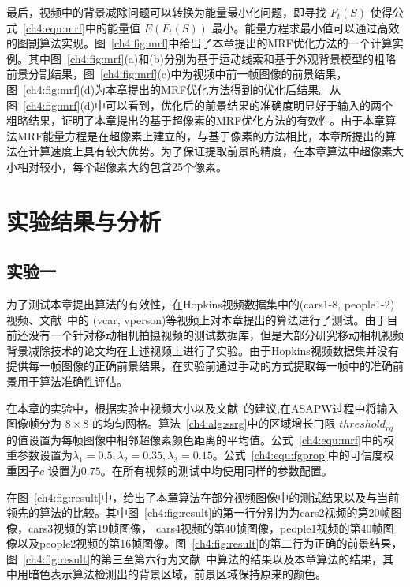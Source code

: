 最后，视频中的背景减除问题可以转换为能量最小化问题，即寻找 $F_{t}(S)$ 使得公式~\ref{ch4:equ:mrf}中的能量值 $E(F_{t}(S))$ 最小。能量方程求最小值可以通过高效的图割算法\cite{graphcut04}实现。图~\ref{ch4:fig:mrf}中给出了本章提出的MRF优化方法的一个计算实例。其中图~\ref{ch4:fig:mrf}(a)和(b)分别为基于运动线索和基于外观背景模型的粗略前景分割结果，图~\ref{ch4:fig:mrf}(c)中为视频中前一帧图像的前景结果，图~\ref{ch4:fig:mrf}(d)为本章提出的MRF优化方法得到的优化后结果。从图~\ref{ch4:fig:mrf}(d)中可以看到，优化后的前景结果的准确度明显好于输入的两个粗略结果，证明了本章提出的基于超像素的MRF优化方法的有效性。由于本章算法MRF能量方程是在超像素上建立的，与基于像素的方法\cite{Multitransform,SubspaceTracking}相比，本章所提出的算法在计算速度上具有较大优势。为了保证提取前景的精度，在本章算法中超像素大小相对较小，每个超像素大约包含25个像素。 \par


 \section{实验结果与分析}
 \label{ch4:sec:results}
 \subsection{实验一}
 \label{ch4:sec:sub:mrst}

为了测试本章提出算法的有效性，在Hopkins视频数据集\cite{HopKinsDataSet}中的(cars1-8, people1-2)视频、文献~中的 (vcar, vperson)等视频上对本章提出的算法进行了测试。由于目前还没有一个针对移动相机拍摄视频的测试数据库，但是大部分研究移动相机视频背景减除技术的论文均在上述视频上进行了实验\cite{iccv2009,LimPRFloating,Multitransform,kwak2011Generalized}。由于Hopkins视频数据集并没有提供每一帧图像的正确前景结果，在实验前通过手动的方式提取每一帧中的准确前景用于算法准确性评估。\par
在本章的实验中，根据实验中视频大小以及文献~\cite{Liu_2013ASAP}的建议,在ASAPW过程中将输入图像帧分为 $8\times8$ 的均匀网格。算法~\ref{ch4:alg:ssrg}中的区域增长门限 $threshold_{rg}$ 的值设置为每帧图像中相邻超像素颜色距离的平均值。公式~\ref{ch4:equ:mrf}中的权重参数设置为$\lambda_{1} = 0.5, \lambda_{2} = 0.35, \lambda_{3} = 0.15$。公式~\ref{ch4:equ:fgprop}中的可信度权重因子$c$ 设置为$0.75$。在所有视频的测试中均使用同样的参数配置。 \par
在图~\ref{ch4:fig:result}中，给出了本章算法在部分视频图像中的测试结果以及与当前领先的算法\cite{kwak2011Generalized,Multitransform,5.8s}的比较。其中图~\ref{ch4:fig:result}的第一行分别为为cars2视频的第20帧图像，cars3视频的第19帧图像， cars4视频的第40帧图像，people1视频的第40帧图像以及people2视频的第16帧图像。图~\ref{ch4:fig:result}的第二行为正确的前景结果，图~\ref{ch4:fig:result}的第三至第六行为文献~中算法的结果以及本章算法的结果，其中用暗色表示算法检测出的背景区域，前景区域保持原来的颜色。

